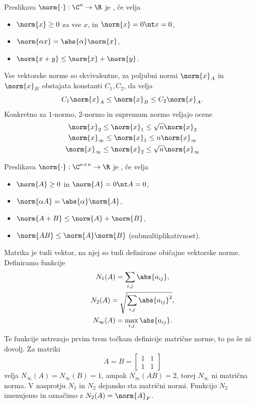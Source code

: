 

\begin{definicija}
  Preslikava $\norm{\cdot} : \C^n \to \R$ je , če velja
  \begin{itemize}
  \item $\norm{x} \ge 0$ za vse $x$, in $\norm{x} = 0 \nt x = 0$,
  \item $\norm{\alpha x} = \abs{\alpha} \norm{x}$,
  \item $\norm{x + y} \le \norm{x} + \norm{y}$.
  \end{itemize}
\end{definicija}

Vse vektorske norme so ekvivalentne, za poljubni normi $\norm{x}_A$ in
$\norm{x}_B$ obstajata konstanti $C_1, C_2$, da velja
\[
  C_1 \norm{x}_A \le \norm{x}_B \le C_2 \norm{x}_A.
\]
Konkretno za 1-normo, 2-normo in supremum normo veljajo ocene
\begin{gather*}
  \norm{x}_2 \le \norm{x}_1 \le \sqrt{n} \norm{x}_2 \\
  \norm{x}_\infty \le \norm{x}_1 \le n \norm{x}_\infty \\
  \norm{x}_\infty \le \norm{x}_2 \le \sqrt{n} \norm{x}_\infty
\end{gather*}


\begin{definicija}
  Preslikava $\norm{\cdot} : \C^{n \times n} \to \R$ je ,
  če velja
  \begin{itemize}
  \item $\norm{A} \ge 0$ in $\norm{A} = 0 \nt A = 0$,
  \item $\norm{\alpha A} = \abs{\alpha} \norm{A}$,
  \item $\norm{A + B} \le \norm{A} + \norm{B}$,
  \item $\norm{A B} \le \norm{A} \norm{B}$ (submultiplikativnost).
  \end{itemize}
\end{definicija}

Matrika je tudi vektor, na njej so tudi definirane običajne vektorske norme.
Definiramo funkcije
\begin{gather*}
  N_1(A) = \sum_{i,j} \abs{a_{ij}}, \\
  N_2(A) = \sqrt{\sum_{i,j} \abs{a_{ij}}^2}, \\
  N_\infty(A) = \max_{i,j} \abs{a_{ij}}.
\end{gather*}
Te funkcije ustrezajo prvim trem točkam definicije matrične norme, to pa še ni
dovolj.
Za matriki
\[
  A = B =
  \begin{bmatrix}
	1 & 1 \\ 1 & 1
  \end{bmatrix}
\]
velja $N_\infty(A) = N_\infty(B) = 1$, ampak $N_\infty(AB) = 2$, torej
$N_\infty$ ni matrična norma.
V nasprotju $N_1$ in $N_2$ dejansko sta matrični normi.
Funkcijo $N_2$ imenujemo  in označimo z $N_2(A) =
\norm{A}_F$.

